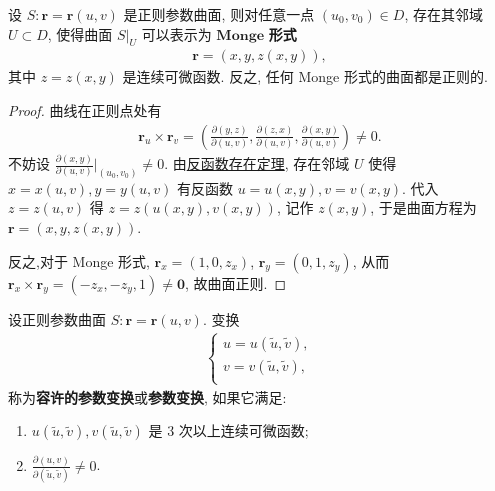 \documentclass[../../main.tex]{subfiles}%
\begin{document}
\begin{theorem}
设 \( S : \bm{r} = \bm{r}(u, v) \) 是正则参数曲面, 则对任意一点 \( (u_0, v_0) \in D \), 存在其邻域 \( U \subset D \), 使得曲面 \( S|_U \) 可以表示为 $\mathbf{Monge}$ \textbf{形式}
\begin{align*}
\bm{r} = (x, y, z(x, y)),
\end{align*}
其中 \( z = z(x, y) \) 是连续可微函数. 反之, 任何 Monge 形式的曲面都是正则的.
\end{theorem}
\begin{proof}
曲线在正则点处有
\begin{align*}
\boldsymbol{r}_u\times \boldsymbol{r}_v=\left( \frac{\partial \left( y,z \right)}{\partial \left( u,v \right)},\frac{\partial \left( z,x \right)}{\partial \left( u,v \right)},\frac{\partial \left( x,y \right)}{\partial \left( u,v \right)} \right) \ne 0.
\end{align*}
不妨设 \( \frac{\partial(x, y)}{\partial(u, v)}\big|_{(u_0, v_0)} \neq 0 \). 由\hyperref[Basis of Analytics-theorem:反函数存在定理]{反函数存在定理}, 存在邻域 \( U \) 使得 \( x = x(u, v), y = y(u, v) \) 有反函数 \( u = u(x, y), v = v(x, y) \). 代入 \( z = z(u, v) \) 得 \( z = z(u(x, y), v(x, y)) \), 记作 \( z(x, y) \), 于是曲面方程为 \( \bm{r} = (x, y, z(x, y)) \). 

反之,对于 Monge 形式, \( \bm{r}_x = (1, 0, z_x) \), \( \bm{r}_y = (0, 1, z_y) \), 从而 \( \bm{r}_x \times \bm{r}_y = (-z_x, -z_y, 1) \neq \bm{0} \), 故曲面正则.
\end{proof}

\begin{definition}
设正则参数曲面 \( S : \bm{r} = \bm{r}(u, v) \). 变换
\begin{align*}
\begin{cases}
u=u(\tilde{u},\tilde{v}),\\
v=v(\tilde{u},\tilde{v}),\\
\end{cases}
\end{align*}
称为\textbf{容许的参数变换}或\textbf{参数变换}, 如果它满足:
\begin{enumerate}[(1)]
\item \( u(\tilde{u}, \tilde{v}), v(\tilde{u}, \tilde{v}) \) 是 3 次以上连续可微函数;
\item \( \frac{\partial(u, v)}{\partial(\tilde{u}, \tilde{v})} \neq 0 \).
\end{enumerate}
\end{definition}
\end{document}
